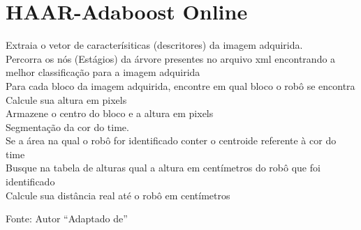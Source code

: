 \section{HAAR-Adaboost Online}
\begin{algorithm}



{

Extraia o vetor de caracterísiticas (descritores) da imagem adquirida.\\
Percorra os nós (Estágios) da árvore presentes no arquivo xml encontrando a melhor classificação para a imagem adquirida\\

	{
		Para cada bloco da imagem adquirida, encontre em qual bloco o robô se encontra\\

		Calcule sua altura em pixels\\

		Armazene o centro do bloco e a altura em pixels\\

		Segmentação da cor do time.\\

		Se a área na qual o robô for identificado conter o centroide referente à cor do time\\

		Busque na tabela de alturas qual a altura em centímetros do robô que foi identificado\\

		Calcule sua distância real até o robô em centímetros\\
	}
}

\caption[Algoritmo de Identificação de robôs. (HAAR-Adaboost Online)]{Fonte: Autor ``Adaptado de'' }
\label{lst:algHaarOn}
\end{algorithm}


	
